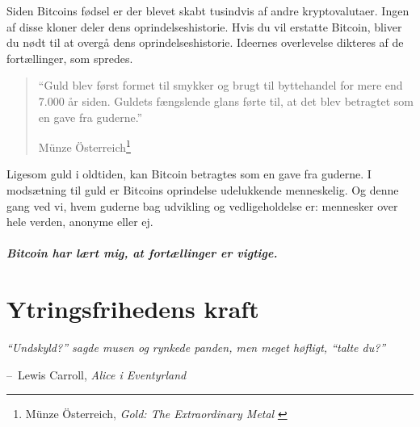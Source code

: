 \documentclass[paper=6in:9in,pagesize=pdftex,
               headinclude=on,footinclude=on,12pt]{scrbook}
\makeatletter
\newenvironment{chapquote}[2][4em]{\setlength{\@tempdima}{#1}%
   \def\chapquote@author{#2}%
   \parshape 1 \@tempdima \dimexpr\textwidth-2\@tempdima\relax%
   \itshape}{\par\normalfont\hfill--\ \chapquote@author\hspace*{\@tempdima}\par\bigskip}
\makeatother
\begin{document}
\newpage

Siden Bitcoins fødsel er der blevet skabt tusindvis af andre kryptovalutaer. Ingen af disse kloner deler dens oprindelseshistorie. Hvis du vil erstatte Bitcoin, bliver du nødt til at overgå dens oprindelseshistorie. Ideernes overlevelse dikteres af de fortællinger, som spredes.\begin{quotation}\begin{samepage} \enquote{Guld blev først formet til smykker og brugt til byttehandel for mere end 7.000 år siden. Guldets fængslende glans førte til, at det blev betragtet som en gave fra guderne.} \begin{flushright} Münze Österreich\footnote{Münze Österreich, \textit{Gold: The Extraordinary Metal} \cite{gold-gift-gods}}
\end{flushright}\end{samepage}\end{quotation}

Ligesom guld i oldtiden, kan Bitcoin betragtes som en gave fra guderne. I modsætning til guld er Bitcoins oprindelse udelukkende menneskelig. Og denne gang ved vi, hvem guderne bag udvikling og vedligeholdelse er: mennesker over hele verden, anonyme eller ej.\paragraph{Bitcoin har lært mig, at fortællinger er vigtige.}%
%
%
%
%

\chapter{Ytringsfrihedens kraft}
\label{les:6}

\begin{chapquote}{Lewis Carroll, \textit{Alice i Eventyrland}} \enquote{Undskyld?} sagde musen og rynkede panden, men meget høfligt, \enquote{talte du?} \end{chapquote}
\end{document}
